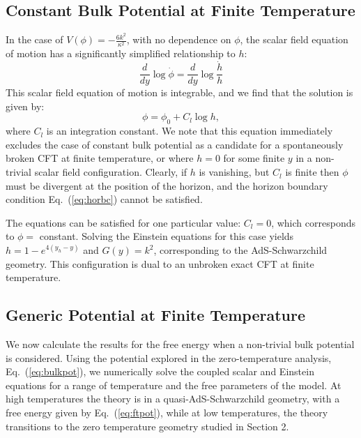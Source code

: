 \documentclass[12pt]{article}
\begin{document}
\subsection{Constant Bulk Potential at Finite Temperature}
In the case of $V(\phi) = -\frac{6k^2}{\kappa^2}$, with no dependence on $\phi$, the scalar field equation of motion has a significantly simplified relationship to $h$:
\begin{equation}
\frac{d}{dy} \log \dot{\phi} = \frac{d}{dy} \log \frac{\dot{h}}{h}
\end{equation}
This scalar field equation of motion is integrable, and we find that the solution is given by:
\begin{equation}
\phi = \phi_0 + C_l \log h,
\end{equation}
where $C_l$ is an integration constant.  We note that this equation immediately excludes the case of constant bulk potential as a candidate for a spontaneously broken CFT at finite temperature, or where $h= 0$ for some finite $y$ in a non-trivial scalar field configuration.  Clearly, if $h$ is vanishing, but $C_l$ is finite then $\phi$ must be divergent at the position of the horizon, and the horizon boundary condition Eq.~(\ref{eq:horbc}) cannot be satisfied.  

The equations can be satisfied for one particular value: $C_l=0$, which corresponds to $\phi = $ constant.  Solving the Einstein equations for this case yields $h = 1 - e^{4(y_h-y)}$ and $G(y)=k^2$, corresponding to the AdS-Schwarzchild geometry.  This configuration is dual to an unbroken exact CFT at finite temperature.

\subsection{Generic Potential at Finite Temperature}
We now calculate the results for the free energy when a non-trivial bulk potential is considered. Using the potential explored in the zero-temperature analysis, Eq.~(\ref{eq:bulkpot}), we numerically solve the coupled scalar and Einstein equations for a range of temperature and the free parameters of the model.
At high temperatures the theory is in a quasi-AdS-Schwarzchild geometry, with a free energy given by Eq.~(\ref{eq:ftpot}), while at low temperatures, the theory transitions to the zero temperature geometry studied in Section 2. 
\end{document}
